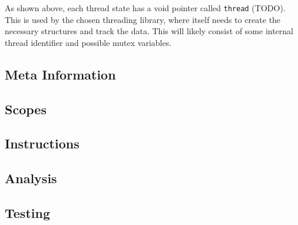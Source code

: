 As shown above, each thread state has a void pointer called {\tt thread}
(TODO). This is used by the chosen threading library, where itself needs to
create the necessary structures and track the data. This will likely consist of
some internal thread identifier and possible mutex variables.

\subsection{Meta Information}
\label{sec:implementation:meta}


\subsection{Scopes}

\subsection{Instructions}
\label{sec:implementation:instr}


\subsection{Analysis}

\subsection{Testing}








